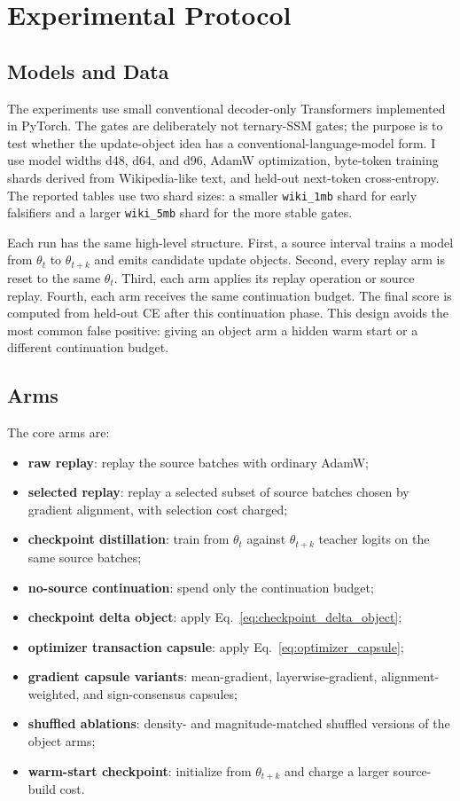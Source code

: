 \documentclass{article}
\begin{document}
\section{Experimental Protocol}

\subsection{Models and Data}

The experiments use small conventional decoder-only Transformers implemented in
PyTorch. The gates are deliberately not ternary-SSM gates; the purpose is to
test whether the update-object idea has a conventional-language-model form. I
use model widths d48, d64, and d96, AdamW optimization, byte-token training
shards derived from Wikipedia-like text, and held-out next-token
cross-entropy. The reported tables use two shard sizes: a smaller
\texttt{wiki\_1mb} shard for early falsifiers and a larger \texttt{wiki\_5mb}
shard for the more stable gates.

Each run has the same high-level structure. First, a source interval trains a
model from $\theta_t$ to $\theta_{t+k}$ and emits candidate update objects.
Second, every replay arm is reset to the same $\theta_t$. Third, each arm
applies its replay operation or source replay. Fourth, each arm receives the
same continuation budget. The final score is computed from held-out CE after
this continuation phase. This design avoids the most common false positive:
giving an object arm a hidden warm start or a different continuation budget.

\subsection{Arms}

The core arms are:
\begin{itemize}
  \item \textbf{raw replay}: replay the source batches with ordinary AdamW;
  \item \textbf{selected replay}: replay a selected subset of source batches
  chosen by gradient alignment, with selection cost charged;
  \item \textbf{checkpoint distillation}: train from $\theta_t$ against
  $\theta_{t+k}$ teacher logits on the same source batches;
  \item \textbf{no-source continuation}: spend only the continuation budget;
  \item \textbf{checkpoint delta object}: apply
  Eq.~\ref{eq:checkpoint_delta_object};
  \item \textbf{optimizer transaction capsule}: apply
  Eq.~\ref{eq:optimizer_capsule};
  \item \textbf{gradient capsule variants}: mean-gradient, layerwise-gradient,
  alignment-weighted, and sign-consensus capsules;
  \item \textbf{shuffled ablations}: density- and magnitude-matched shuffled
  versions of the object arms;
  \item \textbf{warm-start checkpoint}: initialize from $\theta_{t+k}$ and
  charge a larger source-build cost.
\end{itemize}
\end{document}
